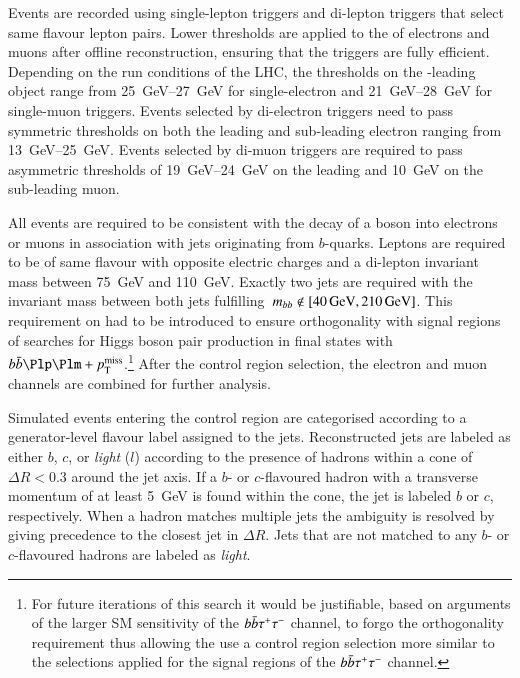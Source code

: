 Events are recorded using single-lepton triggers and di-lepton
triggers that select same flavour lepton pairs. Lower thresholds are
applied to the \pT of electrons and muons after offline
reconstruction, ensuring that the triggers are fully
efficient. Depending on the run conditions of the LHC, the \pT
thresholds on the \pT-leading object range from \SIrange{25}{27}{\GeV}
for single-electron and \SIrange{21}{28}{\GeV} for single-muon
triggers. Events selected by di-electron triggers need to pass
symmetric \pT thresholds on both the leading and sub-leading electron
ranging from \SIrange{13}{25}{\GeV}. Events selected by di-muon
triggers are required to pass asymmetric thresholds of
\SIrange{19}{24}{\GeV} on the leading and \SI{10}{\GeV} on the
sub-leading muon.

All events are required to be consistent with the decay of a \PZ boson
into electrons or muons in association with jets originating from
$b$-quarks. Leptons are required to be of same flavour with opposite
electric charges and a di-lepton invariant mass between \SI{75}{\GeV}
and \SI{110}{\GeV}. Exactly two \btagged jets are required with the
invariant mass between both jets
fulfilling~$\mBB \not\in [\SI{40}{\GeV}, \SI{210}{\GeV}]$. This
requirement on \mBB had to be introduced to ensure orthogonality with
signal regions of searches for Higgs boson pair production in final
states with $\bbbar\Plp\Plm + \pTmissAbs$.\footnote{For future
  iterations of this search it would be justifiable, based on
  arguments of the larger SM \HH sensitivity of the
  $b\bar{b}\tau^{+}\tau^{-}$ channel, to forgo the orthogonality
  requirement thus allowing the use a \ZHF control region selection
  more similar to the selections applied for the signal regions of the
  $b\bar{b}\tau^{+}\tau^{-}$ channel.} After the \ZHF control region
selection, the electron and muon channels are combined for further
analysis.

Simulated \Zjets events entering the \ZHF control region are
categorised according to a generator-level flavour label assigned to
the \btagged jets. Reconstructed jets are labeled as either $b$, $c$,
or \emph{light} ($l$) according to the presence of hadrons within a
cone of $\Delta R < 0.3$ around the jet axis. If a $b$- or
$c$-flavoured hadron with a transverse momentum of at least
\SI{5}{\GeV} is found within the cone, the jet is labeled $b$ or $c$,
respectively. When a hadron matches multiple jets the ambiguity is
resolved by giving precedence to the closest jet in $\Delta R$. Jets
that are not matched to any $b$- or $c$-flavoured hadrons are labeled
as \emph{light}.

